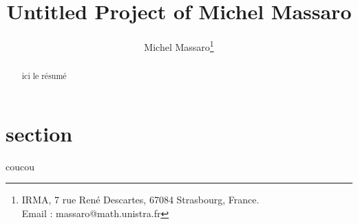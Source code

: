 \documentclass{article_massaro}
\title{Untitled Project of Michel Massaro}
\date{}
\author[1]{Michel Massaro\footnote{IRMA, 7 rue Ren\'e Descartes,
67084 Strasbourg, France.\\
Email : massaro@math.unistra.fr}}
\begin{document}
\maketitle

\begin{abstract}
  ici le résumé
\end{abstract}


\section{section}

coucou
\end{document}
